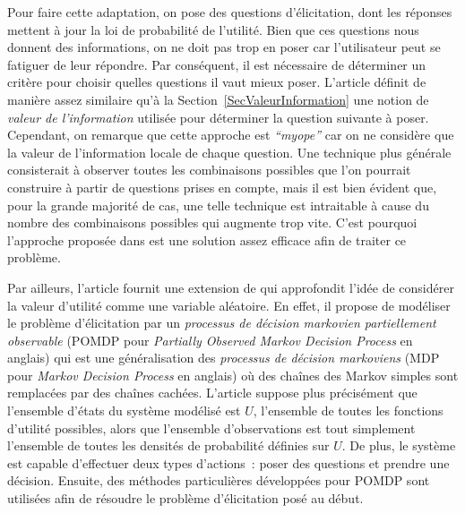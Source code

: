 \documentclass[a4paper,11pt]{article}
\theoremstyle{plain}
\theoremstyle{definition}
\begin{document}
Pour faire cette adaptation, on pose des questions d'élicitation, dont les réponses mettent à jour la loi de probabilité de l'utilité. Bien que ces questions nous donnent des informations, on ne doit pas trop en poser car l'utilisateur peut se fatiguer de leur répondre. Par conséquent, il est nécessaire de déterminer un critère pour choisir quelles questions il vaut mieux poser. L'article \cite{chajewska_making_2000} définit de manière assez similaire qu'à la Section~\ref{SecValeurInformation} une notion de \emph{valeur de l'information} utilisée pour déterminer la question suivante à poser. Cependant, on remarque que cette approche est \emph{``myope''} car on ne considère que la valeur de l'information locale de chaque question. Une technique plus générale consisterait à observer toutes les combinaisons possibles que l'on pourrait construire à partir de questions prises en compte, mais il est bien évident que, pour la grande majorité de cas, une telle technique est intraitable à cause du nombre des combinaisons possibles qui augmente trop vite. C'est pourquoi l'approche proposée dans \cite{chajewska_making_2000} est une solution assez efficace afin de traiter ce problème.

Par ailleurs, l'article \cite{boutilier_pomdp_2002} fournit une extension de \cite{chajewska_making_2000} qui approfondit l'idée de considérer la valeur d'utilité comme une variable aléatoire. En effet, il propose de modéliser le problème d'élicitation par un \emph{processus de décision markovien partiellement observable} (POMDP pour \emph{Partially Observed Markov Decision Process} en anglais) qui est une généralisation des \emph{processus de décision markoviens} (MDP pour \emph{Markov Decision Process} en anglais) où des chaînes des Markov simples sont remplacées par des chaînes cachées. L'article \cite{boutilier_pomdp_2002} suppose plus précisément que l'ensemble d'états du système modélisé est $U$, l'ensemble de toutes les fonctions d'utilité possibles, alors que l'ensemble d'observations est tout simplement l'ensemble de toutes les densités de probabilité définies sur $U$. De plus, le système est capable d'effectuer deux types d'actions~: poser des questions et prendre une décision. Ensuite, des méthodes particulières développées pour POMDP sont utilisées afin de résoudre le problème d'élicitation posé au début. %
\end{document}
